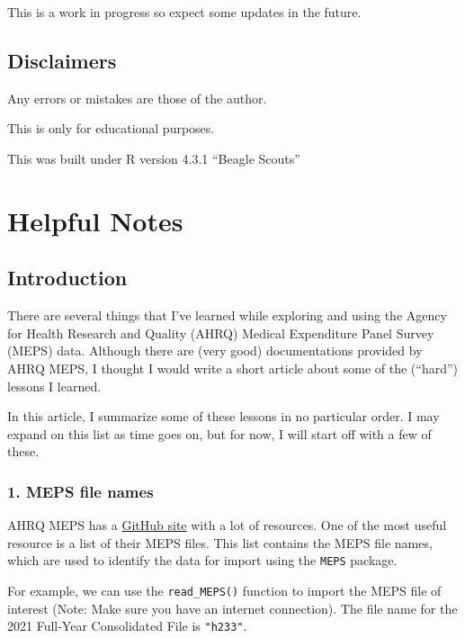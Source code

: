 \documentclass[
]{book}
\begin{document}
This is a work in progress so expect some updates in the future.

\hypertarget{disclaimers-2}{%
\section{Disclaimers}\label{disclaimers-2}}

Any errors or mistakes are those of the author.

This is only for educational purposes.

This was built under R version 4.3.1 ``Beagle Scouts''

\hypertarget{notes}{%
\chapter{Helpful Notes}\label{notes}}

\hypertarget{introduction-6}{%
\section{Introduction}\label{introduction-6}}

There are several things that I've learned while exploring and using the Agency for Health Research and Quality (AHRQ) Medical Expenditure Panel Survey (MEPS) data. Although there are (very good) documentations provided by AHRQ MEPS, I thought I would write a short article about some of the (``hard'') lessons I learned.

In this article, I summarize some of these lessons in no particular order. I may expand on this list as time goes on, but for now, I will start off with a few of these.

\hypertarget{meps-file-names}{%
\subsection{1. MEPS file names}\label{meps-file-names}}

AHRQ MEPS has a \href{https://github.com/HHS-AHRQ/MEPS/tree/master}{GitHub site} with a lot of resources. One of the most useful resource is a list of their MEPS files. This list contains the MEPS file names, which are used to identify the data for import using the \texttt{MEPS} package.

For example, we can use the \texttt{read\_MEPS()} function to import the MEPS file of interest (Note: Make sure you have an internet connection). The file name for the 2021 Full-Year Consolidated File is \texttt{"h233"}.
\end{document}
